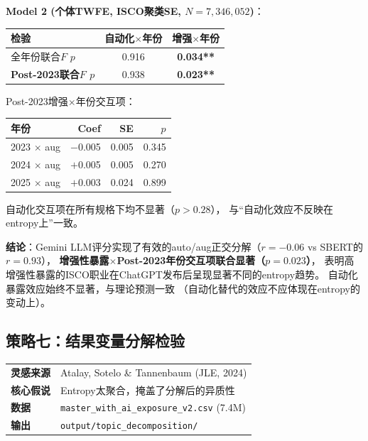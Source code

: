 \documentclass[12pt,a4paper]{ctexart}
\begin{document}
\begin{resultbox}[策略六Gemini改进版结果]

\textbf{Model 2 (个体TWFE, ISCO聚类SE, $N=7{,}346{,}052$)}：

\begin{center}
\small
\begin{tabular}{lcc}
\toprule
检验 & 自动化$\times$年份 & 增强$\times$年份 \\
\midrule
全年份联合$F$ $p$ & 0.916 & \textbf{0.034**} \\
\textbf{Post-2023联合$F$ $p$} & 0.938 & \textbf{0.023**} \\
\bottomrule
\end{tabular}
\end{center}

Post-2023增强$\times$年份交互项：
\begin{center}
\small
\begin{tabular}{lrrr}
\toprule
年份 & Coef & SE & $p$ \\
\midrule
2023 $\times$ aug & $-$0.005 & 0.005 & 0.345 \\
2024 $\times$ aug & $+$0.005 & 0.005 & 0.270 \\
2025 $\times$ aug & $+$0.003 & 0.024 & 0.899 \\
\bottomrule
\end{tabular}
\end{center}

自动化交互项在所有规格下均不显著（$p>0.28$），
与``自动化效应不反映在entropy上''一致。

\textbf{结论}：Gemini LLM评分实现了有效的auto/aug正交分解（$r=-0.06$ vs SBERT的$r=0.93$），
\textbf{增强性暴露$\times$Post-2023年份交互项联合显著（$p=0.023$）}，
表明高增强性暴露的ISCO职业在ChatGPT发布后呈现显著不同的entropy趋势。
自动化暴露效应始终不显著，与理论预测一致
（自动化替代的效应不应体现在entropy的变动上）。
\end{resultbox}


\subsection{策略七：结果变量分解检验}
\label{subsec:topic_decomp}

\begin{center}
\begin{tabular}{ll}
\textbf{灵感来源} & Atalay, Sotelo \& Tannenbaum (JLE, 2024) \\
\textbf{核心假说} & Entropy太聚合，掩盖了分解后的异质性 \\
\textbf{数据} & \texttt{master\_with\_ai\_exposure\_v2.csv} (7.4M) \\
\textbf{输出} & \texttt{output/topic\_decomposition/}
\end{tabular}
\end{center}
\end{document}
